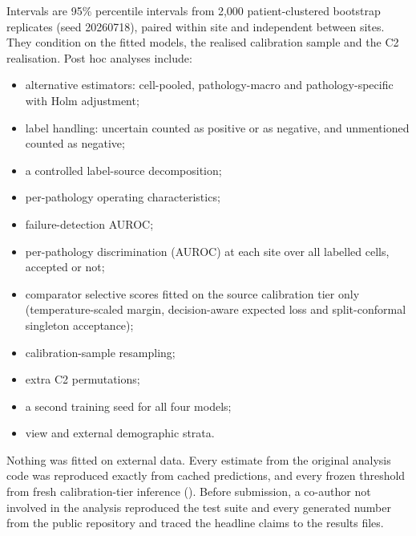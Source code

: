 Intervals are 95\% percentile intervals from 2,000 patient-clustered bootstrap
replicates (seed 20260718), paired within site and independent between sites.
They condition on the fitted models, the realised calibration sample and the
C2 realisation. Post hoc analyses include:
\begin{itemize}
  \item alternative estimators: cell-pooled, pathology-macro and
        pathology-specific with Holm adjustment;\cite{holm1979}
  \item label handling: uncertain counted as positive or as negative, and
        unmentioned counted as negative;
  \item a controlled label-source decomposition;
  \item per-pathology operating characteristics;
  \item failure-detection AUROC;
  \item per-pathology discrimination (AUROC) at each site over all labelled
        cells, accepted or not;
  \item comparator selective scores fitted on the source calibration tier only
        (temperature-scaled margin,\cite{guo2017} decision-aware expected loss and
        split-conformal singleton acceptance\cite{angelopoulos2023});
  \item calibration-sample resampling;
  \item extra C2 permutations;
  \item a second training seed for all four models;
  \item view and external demographic strata.
\end{itemize}
Nothing was fitted on external data. Every estimate from the original analysis code was
reproduced exactly from cached predictions, and every frozen threshold from fresh
calibration-tier inference (). Before submission, a co-author
not involved in the analysis reproduced the test suite and every generated
number from the public repository and traced the headline claims to the
results files.
